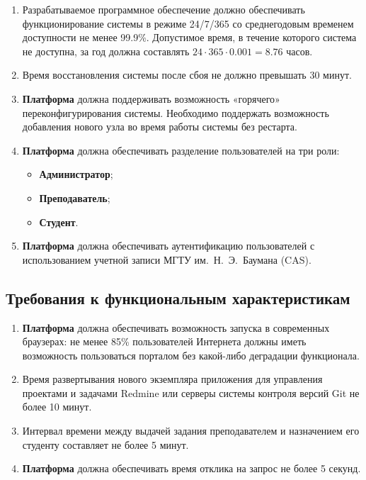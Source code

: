 \begin{enumerate}
	\item Разрабатываемое программное обеспечение должно обеспечивать функционирование системы в режиме 24/7/365 со среднегодовым временем доступности не менее 99.9\%. Допустимое время, в течение которого система не доступна, за год должна составлять $24\cdot365\cdot0.001=8.76$ часов.
	\item Время восстановления системы после сбоя не должно превышать 30 минут.
	\item \textbf{Платформа} должна поддерживать возможность «горячего» переконфигурирования системы. Необходимо поддержать возможность добавления нового узла во время работы системы без рестарта.
	\item  \textbf{Платформа} должна обеспечивать разделение пользователей на три роли:
	\begin{itemize} 
		\item \textbf{Администратор};
		\item \textbf{Преподаватель};
		\item \textbf{Студент}.	
	\end{itemize}
	\item \textbf{Платформа} должна обеспечивать аутентификацию пользователей с использованием учетной записи МГТУ им.~Н.~Э.~Баумана (CAS).
\end{enumerate}

\subsection*{Требования к функциональным характеристикам}

\begin{enumerate}
	\item \textbf{Платформа} должна обеспечивать возможность запуска в современных браузерах: не менее 85\% пользователей Интернета должны иметь возможность пользоваться порталом без какой-либо деградации функционала.
	\item Время развертывания нового экземпляра приложения для управления проектами и задачами Redmine или серверы системы контроля версий Git не более 10 минут.
	\item Интервал времени между выдачей задания преподавателем и назначением его студенту составляет не более 5 минут.
	\item \textbf{Платформа} должна обеспечивать время отклика на запрос не более 5 секунд.
\end{enumerate}

